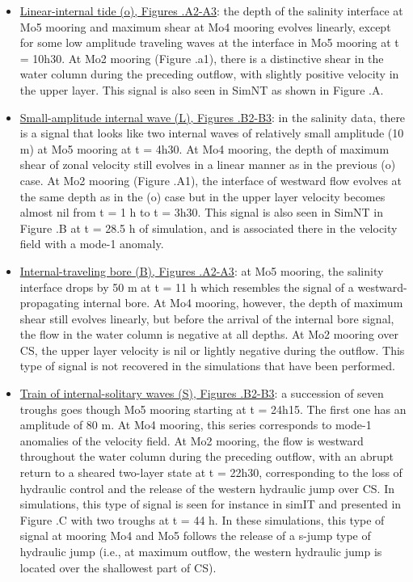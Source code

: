 \begin{itemize}
\item \underline{Linear-internal tide (o), Figures .A2-A3}: the depth of the salinity interface at Mo5 mooring and maximum shear at Mo4 mooring evolves linearly, except for some low amplitude traveling waves at the interface in Mo5 mooring at t = 10h30. At Mo2 mooring (Figure .a1), there is a distinctive shear in the water column during the preceding outflow, with slightly positive velocity in the upper layer. This signal is also seen in SimNT as shown in Figure .A.
%
\item \underline{Small-amplitude internal wave (L), Figures .B2-B3}: in the salinity data, there is a signal that looks like two internal waves of relatively small amplitude (10 m) at Mo5 mooring at t = 4h30. At Mo4 mooring, the depth of maximum shear of zonal velocity still evolves in a linear manner as in the previous (o) case. At Mo2 mooring (Figure .A1), the interface of westward flow evolves at the same depth as in the (o) case but in the upper layer velocity becomes almost nil from t = 1 h to t = 3h30. This signal is also seen in SimNT in Figure .B at t = 28.5 h of simulation, and is associated there in the velocity field with a mode-1 anomaly.
%
\item \underline{Internal-traveling bore (B), Figures .A2-A3}: at Mo5 mooring, the salinity interface drops by 50 m at t = 11 h which resembles the signal of a westward-propagating internal bore. At Mo4 mooring, however, the depth of maximum shear still evolves linearly, but before the arrival of the internal bore signal, the flow in the water column is negative at all depths. At Mo2 mooring over CS, the upper layer velocity is nil or lightly negative during the outflow. This type of signal is not recovered in the simulations that have been performed.
%
\item \underline{Train of internal-solitary waves (S), Figures .B2-B3}: a succession of seven troughs goes though Mo5 mooring starting at t = 24h15. The first one has an amplitude of 80 m. At Mo4 mooring, this series corresponds to mode-1 anomalies of the velocity field. At Mo2 mooring, the flow is westward throughout the water column during the preceding outflow, with an abrupt return to a sheared two-layer state at t = 22h30, corresponding to the loss of hydraulic control and the release of the western hydraulic jump over CS. In simulations, this type of signal is seen for instance in simIT and presented in Figure .C with two troughs at  t = 44 h. In these simulations, this type of signal at mooring Mo4 and Mo5 follows the release of a s-jump type of hydraulic jump (i.e., at maximum outflow, the western hydraulic jump is located over the shallowest part of CS).

\end{itemize}
